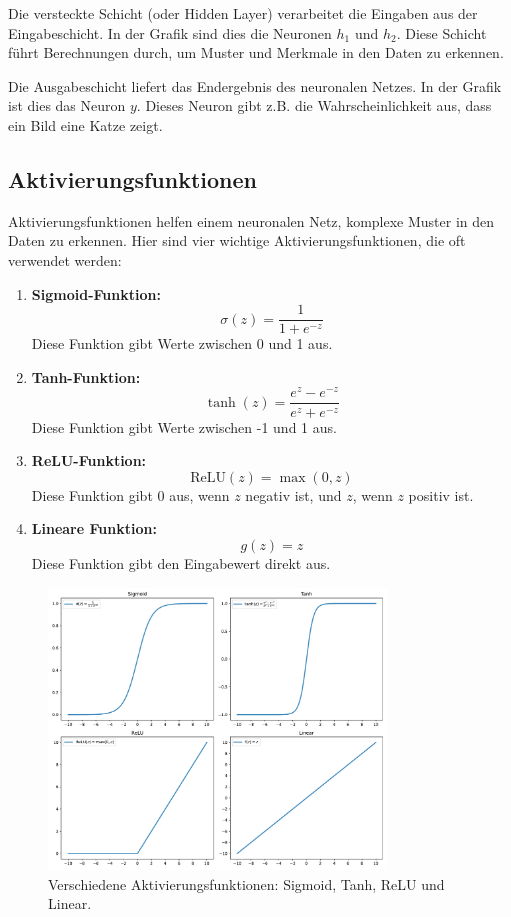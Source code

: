 Die versteckte Schicht (oder Hidden Layer) verarbeitet die Eingaben aus der Eingabeschicht. In der Grafik sind dies die Neuronen \( h_1 \) und \( h_2 \). Diese Schicht führt Berechnungen durch, um Muster und Merkmale in den Daten zu erkennen.

Die Ausgabeschicht liefert das Endergebnis des neuronalen Netzes. In der Grafik ist dies das Neuron \( y \). Dieses Neuron gibt z.B. die Wahrscheinlichkeit aus, dass ein Bild eine Katze zeigt.


\subsection{Aktivierungsfunktionen}

Aktivierungsfunktionen helfen einem neuronalen Netz, komplexe Muster in den Daten zu erkennen. Hier sind vier wichtige Aktivierungsfunktionen, die oft verwendet werden:

\begin{enumerate}
    \item \textbf{Sigmoid-Funktion:} 
    $$
    \sigma(z) = \frac{1}{1 + e^{-z}}
    $$
    Diese Funktion gibt Werte zwischen 0 und 1 aus.
    
    \item \textbf{Tanh-Funktion:}
    $$
    \tanh(z) = \frac{e^z - e^{-z}}{e^z + e^{-z}}
    $$
    Diese Funktion gibt Werte zwischen -1 und 1 aus.
    
    \item \textbf{ReLU-Funktion:}
    $$
    \mathrm{ReLU}(z) = \max(0, z)
    $$
    Diese Funktion gibt 0 aus, wenn \(z\) negativ ist, und \(z\), wenn \(z\) positiv ist.
    
    \item \textbf{Lineare Funktion:}
    $$
    g(z) = z
    $$
    Diese Funktion gibt den Eingabewert direkt aus.
\end{enumerate}

\begin{figure}[h]
    \centering
    \includegraphics[width=0.8\textwidth]{images/activation_functions.pdf}
    \caption{Verschiedene Aktivierungsfunktionen: Sigmoid, Tanh, ReLU und Linear.}
    \label{fig:activation_functions}
\end{figure}

